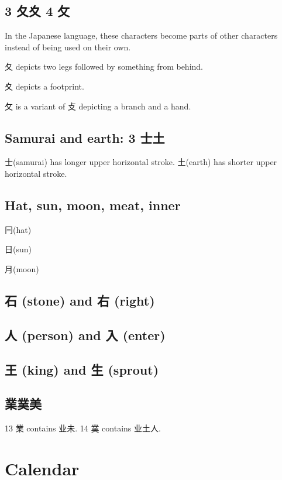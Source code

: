 \subsection{3 夂夊 4 攵}

In the Japanese language,
these characters become parts of other characters
instead of being used on their own.

夂 depicts two legs followed by something from behind.

夊 depicts a footprint.

攵 is a variant of 攴 depicting a branch and a hand.

\subsection{Samurai and earth: 3 士土}

士(samurai) has longer upper horizontal stroke.
土(earth) has shorter upper horizontal stroke.

\subsection{Hat, sun, moon, meat, inner}

冃(hat)

日(sun)

月(moon)

\subsection{石 (stone) and 右 (right)}

\subsection{人 (person) and 入 (enter)}

\subsection{王 (king) and 生 (sprout)}

\subsection{業菐美}

13 業 contains 业未.
14 菐 contains 业土人.

\section{Calendar}

